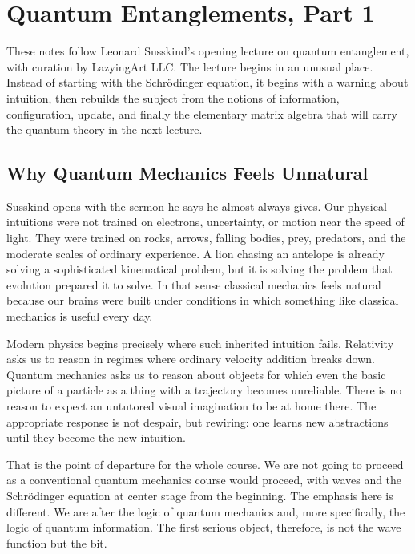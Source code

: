 \chapter{Quantum Entanglements, Part 1}

These notes follow Leonard Susskind's opening lecture on quantum entanglement, with curation by LazyingArt LLC. The lecture begins in an unusual place. Instead of starting with the Schr\"odinger equation, it begins with a warning about intuition, then rebuilds the subject from the notions of information, configuration, update, and finally the elementary matrix algebra that will carry the quantum theory in the next lecture.

\section{Why Quantum Mechanics Feels Unnatural}

Susskind opens with the sermon he says he almost always gives. Our physical intuitions were not trained on electrons, uncertainty, or motion near the speed of light. They were trained on rocks, arrows, falling bodies, prey, predators, and the moderate scales of ordinary experience. A lion chasing an antelope is already solving a sophisticated kinematical problem, but it is solving the problem that evolution prepared it to solve. In that sense classical mechanics feels natural because our brains were built under conditions in which something like classical mechanics is useful every day.

Modern physics begins precisely where such inherited intuition fails. Relativity asks us to reason in regimes where ordinary velocity addition breaks down. Quantum mechanics asks us to reason about objects for which even the basic picture of a particle as a thing with a trajectory becomes unreliable. There is no reason to expect an untutored visual imagination to be at home there. The appropriate response is not despair, but rewiring: one learns new abstractions until they become the new intuition.

That is the point of departure for the whole course. We are not going to proceed as a conventional quantum mechanics course would proceed, with waves and the Schr\"odinger equation at center stage from the beginning. The emphasis here is different. We are after the logic of quantum mechanics and, more specifically, the logic of quantum information. The first serious object, therefore, is not the wave function but the bit.

